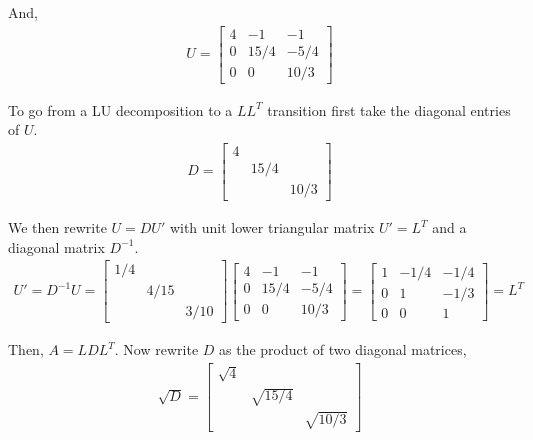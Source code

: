 \documentclass[10pt]{article}
\begin{document}
\begin{solution}[Solution]
And,
\begin{align*}
    U= 
\left[ \begin{array}{rrr} 4 & -1 & -1 \\ 0 & 15/4 & -5/4 \\ 0 & 0 & 10/3 \end{array} \right] 
\end{align*}

To go from a LU decomposition to a \( LL^T \) transition first take the diagonal entries of \( U \).
\begin{align*}
    D = \left[\begin{array}{rrr}4 && \\ & 15/4 &\\ & & 10/3\end{array}\right]
\end{align*}

We then rewrite \( U = DU' \) with unit lower triangular matrix \( U' = L^T \) and a diagonal matrix \( D^{-1} \).
\begin{align*}
    U' = D^{-1}U = \left[\begin{array}{rrr}1/4 & & \\ & 4/15 & \\ & & 3/10\end{array}\right]    
\left[ \begin{array}{rrr} 4 & -1 & -1 \\ 0 & 15/4 & -5/4 \\ 0 & 0 & 10/3 \end{array} \right] = 
    \left[\begin{array}{rrr}1 & -1/4 & -1/4 \\ 0 & 1 &  -1/3 \\ 0 & 0 & 1\end{array}\right] 
    =L^T
\end{align*}

Then, \( A = LDL^T \). Now rewrite \( D \) as the product of two diagonal matrices,
\begin{align*}
    \sqrt{D} = \left[\begin{array}{rrr} \sqrt{4} && \\ & \sqrt{15/4} &\\ & & \sqrt{10/3}\end{array}\right]
\end{align*}


\end{solution}
\end{document}
